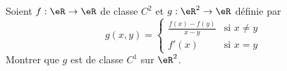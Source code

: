 \begin{exercice}\label{exoCalculDifferentiel0020}

Soient $f:\eR \to \eR$ de classe $C^2$ et $g : \eR ^2 \to \eR$ définie par
\begin{equation}
	g(x,y) =
	\begin{cases}
		\displaystyle\frac{f(x)- f(y)}{x-y}	&	\text{si $x\neq y$}\\
		f'(x)	&	 \text{si $x=y$}
	\end{cases}
	\end{equation}
	Montrer que $g$ est de classe $C^1$ sur $\eR ^2$.
\end{exercice}
